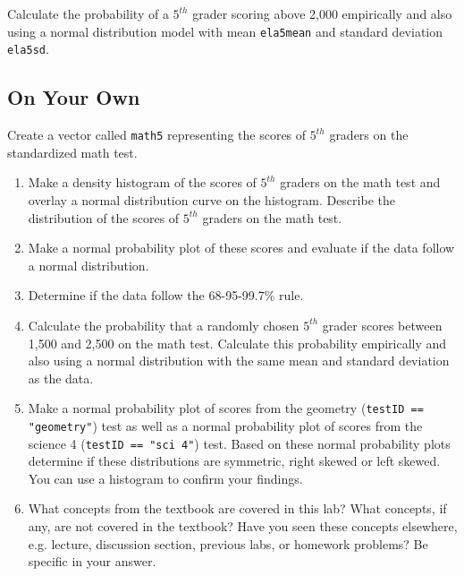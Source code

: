 \documentclass[11pt]{article}
\begin{document}
\begin{exercise}
Calculate the probability of a $5^{th}$ grader scoring above 2,000 empirically and also using a normal distribution model with mean \texttt{ela5mean} and standard deviation \texttt{ela5sd}. 
\end{exercise}

%
\subsection*{On Your Own}

Create a vector called \texttt{math5} representing the scores of $5^{th}$ graders on the standardized math test.

\begin{enumerate}

\item Make a density histogram of the scores of $5^{th}$ graders on the math test and overlay a normal distribution curve on the histogram. Describe the distribution of the scores of $5^{th}$ graders on the math test.

\item Make a normal probability plot of these scores and evaluate if the data follow a normal distribution.

\item Determine if the data follow the 68-95-99.7\% rule.

\item Calculate the probability that a randomly chosen $5^{th}$ grader scores between 1,500 and 2,500 on the math test. Calculate this probability empirically and also using a normal distribution with the same mean and standard deviation as the data.

\item Make a normal probability plot of scores from the geometry (\texttt{testID == "geometry"}) test as well as a normal probability plot of scores from the science 4 (\texttt{testID == "sci 4"}) test. Based on these normal probability plots determine if these distributions are symmetric, right skewed or left skewed. You can use a histogram to confirm your findings.

\item What concepts from the textbook are covered in this lab?  What concepts, if any, are not covered in the textbook?  Have you seen these concepts elsewhere, e.g. lecture, discussion section, previous labs, or homework problems?  Be specific in your answer.

\end{enumerate}
\end{document}
